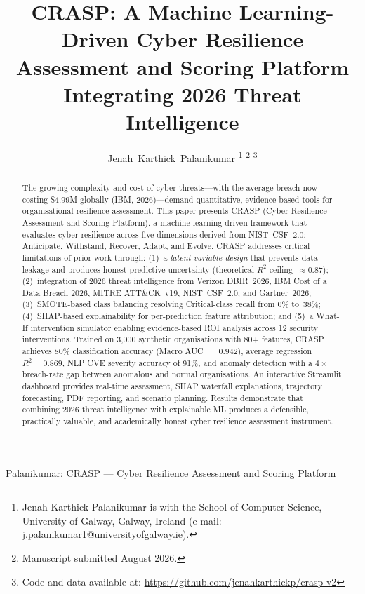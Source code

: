 \documentclass[journal]{IEEEtran}
\begin{document}
\title{CRASP: A Machine Learning-Driven Cyber Resilience Assessment and
Scoring Platform Integrating 2026 Threat Intelligence}

\author{Jenah~Karthick~Palanikumar%
\thanks{Jenah Karthick Palanikumar is with the School of Computer Science,
University of Galway, Galway, Ireland
(e-mail: j.palanikumar1@universityofgalway.ie).}%
\thanks{Manuscript submitted August 2026.}%
\thanks{Code and data available at: \url{https://github.com/jenahkarthickp/crasp-v2}}}

%
{Palanikumar: CRASP --- Cyber Resilience Assessment and Scoring Platform}

\maketitle

\begin{abstract}
The growing complexity and cost of cyber threats---with the average breach
now costing \$4.99M globally (IBM, 2026)---demand quantitative,
evidence-based tools for organisational resilience assessment. This paper
presents CRASP (Cyber Resilience Assessment and Scoring Platform), a
machine learning-driven framework that evaluates cyber resilience across five
dimensions derived from NIST~CSF~2.0: Anticipate, Withstand, Recover, Adapt,
and Evolve. CRASP addresses critical limitations of prior work through:
(1)~a \emph{latent variable design} that prevents data leakage and produces
honest predictive uncertainty (theoretical $R^2$ ceiling~$\approx 0.87$);
(2)~integration of 2026 threat intelligence from Verizon DBIR~2026, IBM Cost
of a Data Breach 2026, MITRE ATT\&CK~v19, NIST~CSF~2.0, and Gartner~2026;
(3)~SMOTE-based class balancing resolving Critical-class recall from 0\%
to~38\%; (4)~SHAP-based explainability for per-prediction feature attribution;
and (5)~a What-If intervention simulator enabling evidence-based ROI analysis
across 12 security interventions. Trained on 3,000 synthetic organisations
with 80+ features, CRASP achieves 80\% classification accuracy (Macro
AUC~$= 0.942$), average regression $R^2 = 0.869$, NLP CVE severity accuracy
of 91\%, and anomaly detection with a $4\times$ breach-rate gap between
anomalous and normal organisations. An interactive Streamlit dashboard
provides real-time assessment, SHAP waterfall explanations, trajectory
forecasting, PDF reporting, and scenario planning. Results demonstrate that
combining 2026 threat intelligence with explainable ML produces a
defensible, practically valuable, and academically honest cyber resilience
assessment instrument.
\end{abstract}
\end{document}
